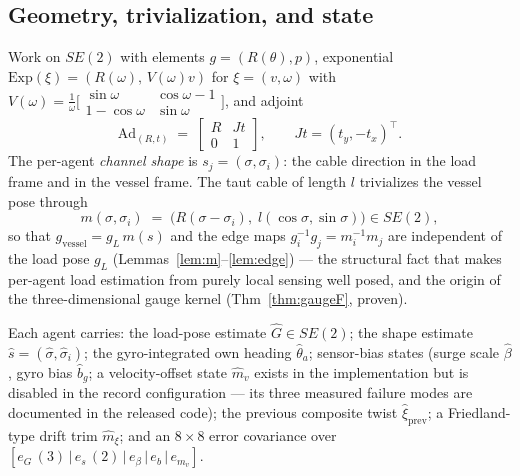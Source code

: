 \documentclass[letterpaper, 10pt, journal]{IEEEtran}
\begin{document}
\subsection{Geometry, trivialization, and state}
Work on $SE(2)$ with elements $g = (R(\theta), p)$, exponential
$\mathrm{Exp}(\xi) = (R(\omega),\, V(\omega)v)$ for $\xi = (v, \omega)$ with
$V(\omega) = \tfrac{1}{\omega}\bigl[\begin{smallmatrix}\sin\omega &
\cos\omega - 1\\ 1-\cos\omega & \sin\omega\end{smallmatrix}\bigr]$, and adjoint
\begin{equation}
\mathrm{Ad}_{(R,t)} \;=\; \begin{bmatrix} R & Jt \\ 0 & 1 \end{bmatrix},
\qquad Jt = (t_y, -t_x)^\top .
\end{equation}
The per-agent \emph{channel shape} is $s_j = (\sigma, \sigma_i)$: the cable
direction in the load frame and in the vessel frame. The taut cable of length
$l$ trivializes the vessel pose through
\begin{equation}\label{eq:triv}
m(\sigma, \sigma_i) \;=\; \bigl(R(\sigma - \sigma_i),\;
l(\cos\sigma, \sin\sigma)\bigr) \in SE(2),
\end{equation}
so that $g_{\mathrm{vessel}} = g_L\, m(s)$ and the edge maps
$g_i^{-1} g_j = m_i^{-1} m_j$ are independent of the load pose $g_L$
(Lemmas~\ref{lem:m}--\ref{lem:edge}) --- the structural fact that makes
per-agent load estimation from purely local sensing well posed, and the origin
of the three-dimensional gauge kernel (Thm~\ref{thm:gaugeF}, proven).

Each agent carries: the load-pose estimate $\hat G \in SE(2)$; the shape
estimate $\hat s = (\hat\sigma, \hat\sigma_i)$; the gyro-integrated own heading
$\hat\theta_a$; sensor-bias states (surge scale $\hat\beta$, gyro bias
$\hat b_g$; a velocity-offset state $\hat m_v$ exists in the implementation but
is disabled in the record configuration --- its three measured failure modes
are documented in the released code); the previous composite twist
$\hat\xi_{\mathrm{prev}}$; a Friedland-type drift trim $\hat m_\xi$; and an
$8{\times}8$ error covariance over
$[e_G\,(3)\,|\,e_s\,(2)\,|\,e_\beta\,|\,e_b\,|\,e_{m_v}]$.
\end{document}
